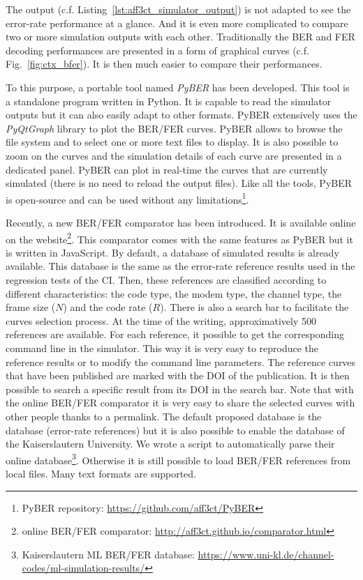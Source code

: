 
The \AFFECT output (c.f. Listing~\ref{lst:aff3ct_simulator_output}) is not
adapted to see the error-rate performance at a glance. And it is even more
complicated to compare two or more simulation outputs with each other.
Traditionally the BER and FER decoding performances are presented in a form of
graphical curves (c.f. Fig.~\ref{fig:ctx_bfer}). It is then much easier to
compare their performances.

To this purpose, a portable tool named \emph{PyBER} has been developed.
This tool is a standalone program written in Python. It is capable to read the
\AFFECT simulator outputs but it can also easily adapt to other formats. PyBER
extensively uses the \emph{PyQtGraph} library to plot the BER/FER curves. PyBER
allows to browse the file system and to select one or more text files to
display. It is also possible to zoom on the curves and the simulation details of
each curve are presented in a dedicated panel. PyBER can plot in real-time the
curves that are currently simulated (there is no need to reload the \AFFECT
output files). Like all the \AFFECT tools, PyBER is open-source and can be used
without any limitations\footnote{PyBER repository:
\url{https://github.com/aff3ct/PyBER}}.

Recently, a new BER/FER comparator has been introduced. It is available online
on the \AFFECT website\footnote{\AFFECT online BER/FER comparator:
\url{http://aff3ct.github.io/comparator.html}}. This comparator comes with the
same features as PyBER but it is written in JavaScript. By default, a database
of \AFFECT simulated results is already available. This database is the same as
the error-rate reference results used in the regression tests of the CI.
Then, these references are classified according to different characteristics:
the code type, the modem type, the channel type, the frame size ($N$) and the
code rate ($R$). There is also a search bar to facilitate the curves selection
process. At the time of the writing, approximatively 500 references are
available. For each reference, it possible to get the corresponding command line
in the \AFFECT simulator. This way it is very easy to reproduce the reference
results or to modify the command line parameters. The reference curves that have
been published are marked with the DOI of the publication. It is then possible
to search a specific result from its DOI in the search bar. Note that with the
online BER/FER comparator it is very easy to share the selected curves with
other people thanks to a permalink. The default proposed database is the
\AFFECT database (error-rate references) but it is also possible to enable the
database of the Kaiserslautern University. We wrote a script to automatically
parse their online database\footnote{Kaiserslautern ML BER/FER database:
\url{https://www.uni-kl.de/channel-codes/ml-simulation-results/}}. Otherwise it
is still possible to load BER/FER references from local files. Many text formats
are supported.

